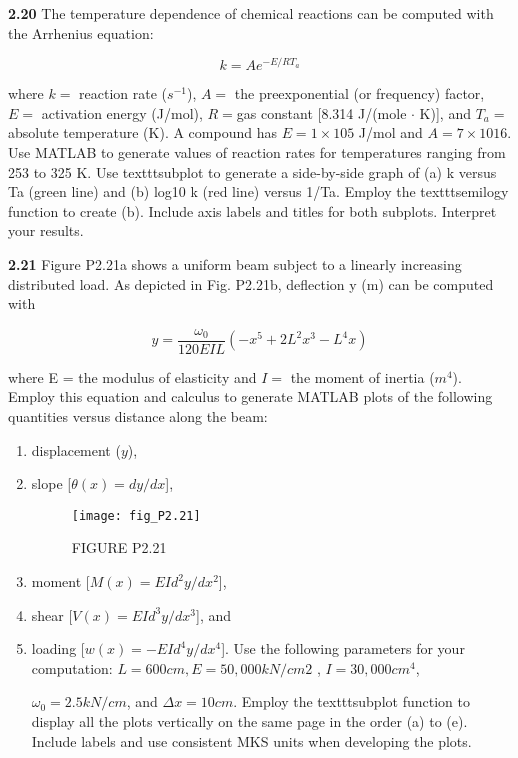 \documentclass[../main.tex]{subfiles}
\begin{document}
\begin{multicols}{2}
\textbf{2.20} The temperature dependence of chemical reactions can
be computed with the Arrhenius equation:

$$k=Ae^{-E/RT_a}$$

where $k =$ reaction rate ($s^{-1}$), $A =$ the preexponential (or frequency) factor, 
$E =$ activation energy (J/mol), $R = $gas constant [8.314 J/(mole $\cdot$  K)], and $T_a =$ absolute temperature
(K). A compound has $E = 1 \times  105$ J/mol and $A = 7 \times 1016$.
Use MATLAB to generate values of reaction rates for
temperatures ranging from 253 to 325 K. Use texttt{subplot} to
generate a side-by-side graph of (a) k versus Ta (green line)
and (b) log10 k (red line) versus 1/Ta. Employ the texttt{semilogy}
function to create (b). Include axis labels and titles for both
subplots. Interpret your results.


\textbf{2.21} Figure P2.21a shows a uniform beam subject to a linearly increasing distributed load. As depicted in Fig. P2.21b,
deflection y (m) can be computed with

$$y=\dfrac{\omega_0}{120EIL}(-x^5+2L^2x^3-L^4x)$$

where E = the modulus of elasticity and $I =$ the moment of
inertia ($m^4$). Employ this equation and calculus to generate
MATLAB plots of the following quantities versus distance
along the beam:

\begin{enumerate}[label=(\alph*)]
	\item displacement ($y$), 
	\item slope [$\theta(x) = dy/dx$], 


\begin{figure}[H]
	\centering
	\texttt{[image: fig\_P2.21]}
   \caption*{\textsf{FIGURE P2.21}}
   \label{fig_P2.6}
\end{figure}
\item moment [$M(x) = EId^2 y/dx^2$],
\item shear [$V(x) = EId^3 y/dx^3$], and

\item loading [$w(x) = -EId^4 y/dx^4$].
Use the following parameters for your computation:
$L = 600 cm, E = 50,000 kN/cm2$ , $I = 30,000 cm^4$,

$\omega_0 = 2.5 kN/cm$, and $\Delta x = 10 cm$. Employ the texttt{subplot}
function to display all the plots vertically on the same page
in the order (a) to (e). Include labels and use consistent MKS
units when developing the plots.
\end{enumerate}


\end{multicols}
\end{document}
